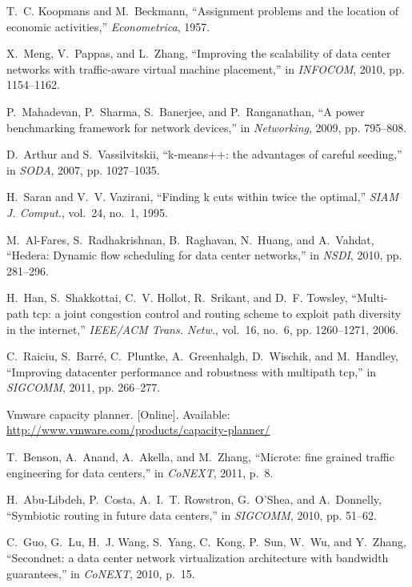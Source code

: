\documentclass[journal,single-space,two column,twoside,10pt]{IEEEtran}
\begin{document}
\begin{thebibliography}{1}
T.~C. Koopmans and M.~Beckmann, ``Assignment problems and the location of
  economic activities,'' \emph{Econometrica}, 1957.

X.~Meng, V.~Pappas, and L.~Zhang, ``Improving the scalability of data center
  networks with traffic-aware virtual machine placement,'' in \emph{INFOCOM},
  2010, pp. 1154--1162.

P.~Mahadevan, P.~Sharma, S.~Banerjee, and P.~Ranganathan, ``A power
  benchmarking framework for network devices,'' in \emph{Networking}, 2009, pp.
  795--808.

D.~Arthur and S.~Vassilvitskii, ``k-means++: the advantages of careful
  seeding,'' in \emph{SODA}, 2007, pp. 1027--1035.

H.~Saran and V.~V. Vazirani, ``Finding k cuts within twice the optimal,''
  \emph{SIAM J. Comput.}, vol.~24, no.~1, 1995.

M.~Al-Fares, S.~Radhakrishnan, B.~Raghavan, N.~Huang, and A.~Vahdat, ``Hedera:
  Dynamic flow scheduling for data center networks,'' in \emph{NSDI}, 2010, pp.
  281--296.

H.~Han, S.~Shakkottai, C.~V. Hollot, R.~Srikant, and D.~F. Towsley,
  ``Multi-path tcp: a joint congestion control and routing scheme to exploit
  path diversity in the internet,'' \emph{IEEE/ACM Trans. Netw.}, vol.~16,
  no.~6, pp. 1260--1271, 2006.

C.~Raiciu, S.~Barr{\'e}, C.~Pluntke, A.~Greenhalgh, D.~Wischik, and M.~Handley,
  ``Improving datacenter performance and robustness with multipath tcp,'' in
  \emph{SIGCOMM}, 2011, pp. 266--277.

Vmware capacity planner. [Online]. Available:
  \url{http://www.vmware.com/products/capacity-planner/}

T.~Benson, A.~Anand, A.~Akella, and M.~Zhang, ``Microte: fine grained traffic
  engineering for data centers,'' in \emph{CoNEXT}, 2011, p.~8.

H.~Abu-Libdeh, P.~Costa, A.~I.~T. Rowstron, G.~O'Shea, and A.~Donnelly,
  ``Symbiotic routing in future data centers,'' in \emph{SIGCOMM}, 2010, pp.
  51--62.

C.~Guo, G.~Lu, H.~J. Wang, S.~Yang, C.~Kong, P.~Sun, W.~Wu, and Y.~Zhang,
  ``Secondnet: a data center network virtualization architecture with bandwidth
  guarantees,'' in \emph{CoNEXT}, 2010, p.~15.


\end{thebibliography}
\end{document}
